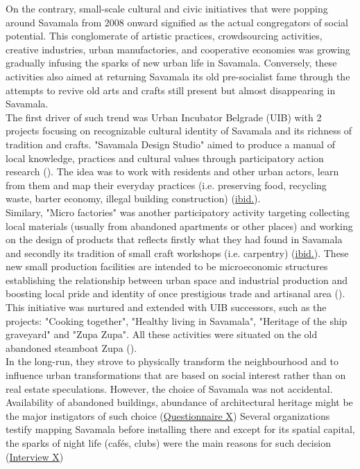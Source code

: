\documentclass[11pt]{report}
\begin{document}
On the contrary, small-scale cultural and civic initiatives that were popping around Savamala from 2008 onward signified as the actual congregators of social potential.
This conglomerate of artistic practices, crowdsourcing activities, creative industries, urban manufactories, and cooperative economies was growing gradually infusing the sparks of new urban life in Savamala.
Conversely, these activities also aimed at returning Savamala its old pre-socialist fame through the attempts to revive old arts and crafts still present but almost disappearing in Savamala.
\\

The first driver of such trend was Urban Incubator Belgrade (UIB) with 2 projects focusing on recognizable cultural identity of Savamala and its richness of tradition and crafts.
"Savamala Design Studio" aimed to produce a manual of local knowledge, practices and cultural values through participatory action research (\href{Cvetinovic}{\cite{cvetinovic_engine_2013}}).
The idea was to work with residents and other urban actors, learn from them and map their everyday practices (i.e. preserving food, recycling waste, barter economy, illegal building construction) (\href{Cvetinovic}{ibid.}).
\\

Similary, "Micro factories" was another participatory activity targeting collecting local materials (usually from abandoned apartments or other places) and working on the design of products that reflects firstly what they had found in Savamala and secondly its tradition of small craft workshops (i.e. carpentry) (\href{Cvetinovic}{ibid.}). 
These new small production facilities are intended to be microeconomic structures establishing the relationship between urban space and industrial production and boosting local pride and identity of once prestigious trade and artisanal area (\href{ref}{\citealt{factories_micro_2013}}).
This initiative was nurtured and extended with UIB successors, such as the projects: "Cooking together", "Healthy living in Savamala", "Heritage of the ship graveyard" and "Zupa Zupa".
All these activities were situated on the old abandoned steamboat Zupa (\href{ref}{\citealt{belic_parobrod_2014}}).
\\

In the long-run, they strove to physically transform the neighbourhood and to influence urban transformations that are based on social interest rather than on real estate speculations. 
However, the choice of Savamala was not accidental.
Availability of abandoned buildings, abundance of architectural heritage might be the major instigators of such choice
(\href{Questionnaire Experts Savamala}{Questionnaire X})
Several organizations testify mapping Savamala before installing there and except for its spatial capital, the sparks of night life (cafés, clubs) were the main reasons for such decision
(\href{InterviewX}{Interview X})
\\
\end{document}
